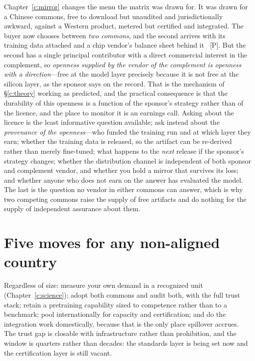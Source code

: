 Chapter~\ref{c:mirror} changes the menu the matrix was drawn for. It was drawn for a Chinese commons, free to download but unaudited and jurisdictionally awkward, against a Western product, metered but certified and integrated. The buyer now chooses between \emph{two commons}, and the second arrives with its training data attached and a chip vendor's balance sheet behind it~\cite{nemotron,amd-open} [P]. But the second has a single principal contributor with a direct commercial interest in the complement, so \emph{openness supplied by the vendor of the complement is openness with a direction}---free at the model layer precisely because it is not free at the silicon layer, as the sponsor says on the record. That is the mechanism of \S\ref{c:theory} working as predicted, and the practical consequence is that the durability of this openness is a function of the sponsor's strategy rather than of the licence, and the place to monitor it is an earnings call. Asking about the licence is the least informative question available; ask instead about the \emph{provenance of the openness}---who funded the training run and at which layer they earn; whether the training data is released, so the artifact can be re-derived rather than merely fine-tuned; what happens to the \emph{next} release if the sponsor's strategy changes; whether the distribution channel is independent of both sponsor and complement vendor, and whether you hold a mirror that survives its loss; and whether anyone who does not earn on the answer has evaluated the model. The last is the question no vendor in either commons can answer, which is why two competing commons raise the supply of free artifacts and do nothing for the supply of independent assurance about them.

\section{Five moves for any non-aligned country}

Regardless of size: measure your own demand in a recognized unit (Chapter~\ref{c:science}); adopt both commons and audit both, with the full trust stack; retain a pretraining capability sized to competence rather than to a benchmark; pool internationally for capacity and certification; and do the integration work domestically, because that is the only place spillover accrues. The trust gap is closable with infrastructure rather than prohibition, and the window is quarters rather than decades: the standards layer is being set now and the certification layer is still vacant.

